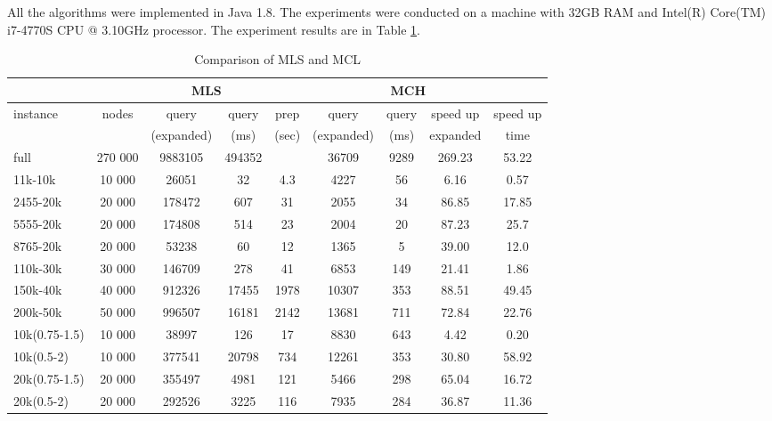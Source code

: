 
All the algorithms were implemented in Java 1.8. The experiments were conducted on a machine with 
32GB RAM and Intel(R) Core(TM) i7-4770S CPU @ 3.10GHz processor. The experiment results are in Table \ref{result}. 

\begin{table}[h]
\tiny
\caption{Comparison of MLS and MCL}
\label{result}
\begin{tabular}{l|c|cc|ccccc}
 & & \multicolumn{2}{c}{MLS} & \multicolumn{5}{c}{MCH} \\ \cline{3-6} \hline
instance & nodes & query & query & prep & query & query & speed up & speed up \\ \hline
& & (expanded) & (ms) & (sec) & (expanded) & (ms) & expanded & time \\ \hline
full & 270 000 & 9883105 & 494352 & & 36709 & 9289 & 269.23 & 53.22  \\ \hline
11k-10k & 10 000 & 26051 & 32 & 4.3 & 4227 & 56 & 6.16 & 0.57 \\ \hline
2455-20k & 20 000 & 178472 & 607 & 31 & 2055 & 34 & 86.85 & 17.85 \\ \hline
5555-20k & 20 000 & 174808 & 514 & 23 & 2004 & 20 & 87.23 & 25.7 \\ \hline
8765-20k & 20 000 & 53238 & 60 & 12 & 1365 & 5 & 39.00 & 12.0 \\ \hline
110k-30k & 30 000 & 146709 & 278 & 41 & 6853 & 149 & 21.41 & 1.86 \\ \hline
150k-40k & 40 000 & 912326 & 17455 & 1978 & 10307 & 353 & 88.51& 49.45 \\ \hline
200k-50k & 50 000 & 996507 & 16181 & 2142 & 13681 & 711 & 72.84& 22.76 \\ \hline
10k(0.75-1.5) & 10 000  & 38997 & 126 & 17 & 8830 & 643 & 4.42 & 0.20 \\ \hline
10k(0.5-2) & 10 000     & 377541 & 20798 & 734 & 12261 & 353 & 30.80 & 58.92 \\ \hline
20k(0.75-1.5) & 20 000 & 355497 & 4981 & 121 & 5466 & 298 & 65.04 & 16.72 \\ \hline
20k(0.5-2) & 20 000    & 292526 & 3225 & 116 & 7935 & 284 & 36.87 & 11.36 \\ \hline

\end{tabular}
\end{table}

